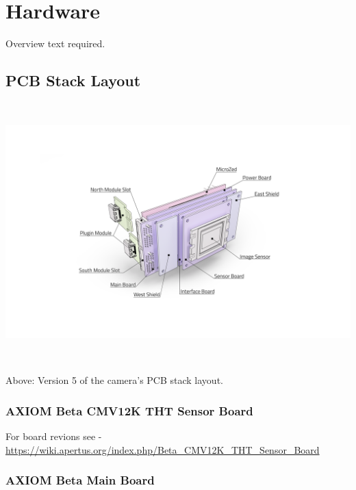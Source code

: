 \section{Hardware}

Overview text required.





\subsection{PCB Stack Layout}

\begin{center}
\includegraphics[height=10cm]{images/PCB_grey_new_pastel_labels-01}
\end{center}

Above: Version 5 of the camera's PCB stack layout.\\





\subsubsection{AXIOM Beta CMV12K THT Sensor Board}




For board revions see - \href{https://wiki.apertus.org/index.php/Beta_CMV12K_THT_Sensor_Board}{https://wiki.apertus.org/index.php/Beta\_CMV12K\_THT\_Sensor\_Board}





\subsubsection{AXIOM Beta Main Board}

